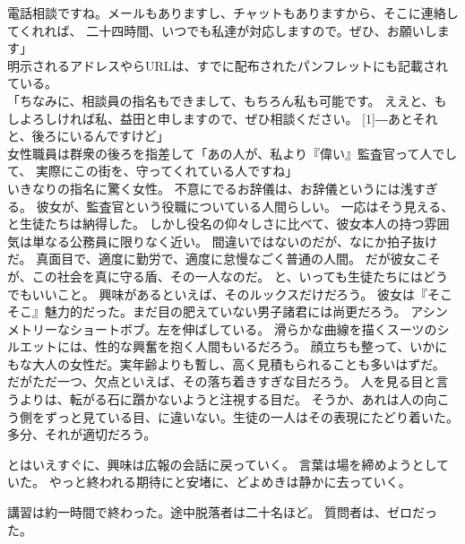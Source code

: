 \documentclass[../NenokuniMain]{subfiles}
\begin{document}
電話相談ですね。メールもありますし、チャットもありますから、そこに連絡してくれれば、
二十四時間、いつでも私達が対応しますので。ぜひ、お願いします」\\
明示されるアドレスやらURLは、すでに配布されたパンフレットにも記載されている。\\
「ちなみに、相談員の指名もできまして、もちろん私も可能です。
ええと、もしよろしければ私、益田と申しますので、ぜひ相談ください。
\scalebox{2}[1]{―}あとそれと、後ろにいるんですけど」\\
女性職員は群衆の後ろを指差して「あの人が、私より『偉い』監査官って人でして、
実際にこの街を、守ってくれている人ですね」\\
いきなりの指名に驚く女性。
不意にでるお辞儀は、お辞儀というには浅すぎる。
彼女が、監査官という役職についている人間らしい。
一応はそう見える、と生徒たちは納得した。
しかし役名の仰々しさに比べて、彼女本人の持つ雰囲気は単なる公務員に限りなく近い。
間違いではないのだが、なにか拍子抜けだ。
真面目で、適度に勤労で、適度に怠慢なごく普通の人間。
だが彼女こそが、この社会を真に守る盾、その一人なのだ。
と、いっても生徒たちにはどうでもいいこと。
興味があるといえば、そのルックスだけだろう。
彼女は『そこそこ』魅力的だった。まだ目の肥えていない男子諸君には尚更だろう。
アシンメトリーなショートボブ。左を伸ばしている。
滑らかな曲線を描くスーツのシルエットには、性的な興奮を抱く人間もいるだろう。
顔立ちも整って、いかにもな大人の女性だ。実年齢よりも暫し、高く見積もられることも多いはずだ。
だがただ一つ、欠点といえば、その落ち着きすぎな目だろう。
人を見る目と言うよりは、転がる石に躓かないようと注視する目だ。
そうか、あれは人の向こう側をずっと見ている目、に違いない。生徒の一人はその表現にたどり着いた。
多分、それが適切だろう。

とはいえすぐに、興味は広報の会話に戻っていく。
言葉は場を締めようとしていた。
やっと終われる期待にと安堵に、どよめきは静かに去っていく。

講習は約一時間で終わった。途中脱落者は二十名ほど。
質問者は、ゼロだった。\\
\end{document}
